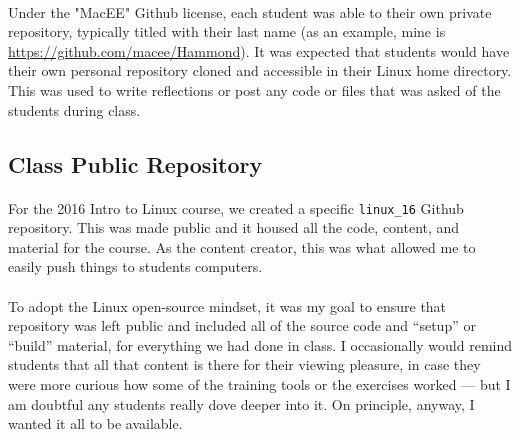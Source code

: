 \documentclass[11pt]{article}
\begin{document}
	\paragraph{} Under the "MacEE" Github license, each student was able to their own private repository, typically titled with their last name (as an example, mine is \href{https://github.com/macee/Hammond}{https://github.com/macee/Hammond}). It was expected that students would have their own personal repository cloned and accessible in their Linux home directory. This was used to write reflections or post any code or files that was asked of the students during class. 

	\subsection{Class Public Repository}

	\paragraph{} For the 2016 Intro to Linux course, we created a specific \texttt{linux\_16} Github repository. This was made public and it housed all the code, content, and material for the course. As the content creator, this was what allowed me to easily push things to students computers. 

	\paragraph{} To adopt the Linux open-source mindset, it was my goal to ensure that repository was left public and included all of the source code and ``setup'' or ``build'' material, for everything we had done in class. I occasionally would remind students that all that content is there for their viewing pleasure, in case they were more curious how some of the training tools or the exercises worked --- but I am doubtful any students really dove deeper into it. On principle, anyway, I wanted it all to be available.


	


\end{document}
